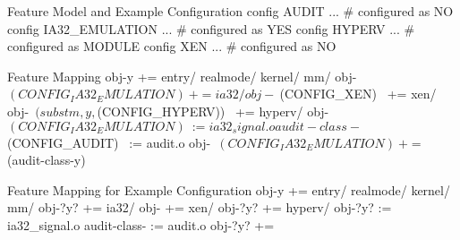 \begin{frame}[fragile]{\myframetitle}
	\begin{mycolumns}

		\begin{kconfigtight}[basicstyle=\footnotesize]{Feature Model and Example Configuration}
			config AUDIT ... # configured as NO
			config IA32_EMULATION ... # configured as YES
			config HYPERV ... # configured as MODULE
			config XEN ... # configured as NO
\end{kconfigtight}
	\mynextcolumn
		\begin{kbuildtight}[basicstyle=\small]{Feature Mapping}
obj-y += entry/ realmode/ kernel/ mm/
obj-~$(CONFIG_IA32_EMULATION)~ += ia32/
obj-~$(CONFIG_XEN)~ += xen/
obj-~$(subst m,y,$(CONFIG_HYPERV))~ += hyperv/
obj-~$(CONFIG_IA32_EMULATION)~ := ia32_signal.o
audit-class-~$(CONFIG_AUDIT)~ := audit.o
obj-~$(CONFIG_IA32_EMULATION)~ += ~$(audit-class-y)~
		\end{kbuildtight}

		\begin{kbuildtight}[basicstyle=\small]{Feature Mapping for Example Configuration}
obj-y += entry/ realmode/ kernel/ mm/
obj-?y? += ia32/
obj- += xen/
obj-?y? += hyperv/
obj-?y? := ia32_signal.o
audit-class- := audit.o
obj-?y? +=
		\end{kbuildtight}

	\end{mycolumns}
\end{frame}


